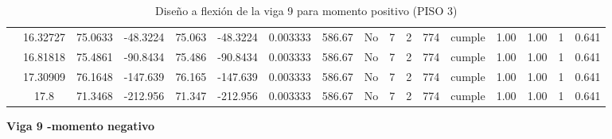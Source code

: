 \begin{table}[H]
{\begin{tabular}{|c|c|c|c|c|c|c|c|c|c|c|c|c|c|c|c|c|}
\cline{2-17}        & 16.32727 & 75.0633 & -48.3224 & 75.063 & -48.3224 & 0.003333 & 586.67 & No  & 7   & 2   & 774 & \cellcolor[rgb]{ .776,  .937,  .808}cumple & 1.00 & 1.00 & 1   & 0.641 \bigstrut\\
\cline{2-17}        & 16.81818 & 75.4861 & -90.8434 & 75.486 & -90.8434 & 0.003333 & 586.67 & No  & 7   & 2   & 774 & \cellcolor[rgb]{ .776,  .937,  .808}cumple & 1.00 & 1.00 & 1   & 0.641 \bigstrut\\
\cline{2-17}        & 17.30909 & 76.1648 & -147.639 & 76.165 & -147.639 & 0.003333 & 586.67 & No  & 7   & 2   & 774 & \cellcolor[rgb]{ .776,  .937,  .808}cumple & 1.00 & 1.00 & 1   & 0.641 \bigstrut\\
\cline{2-17}        & 17.8 & 71.3468 & -212.956 & 71.347 & -212.956 & 0.003333 & 586.67 & No  & 7   & 2   & 774 & \cellcolor[rgb]{ .776,  .937,  .808}cumple & 1.00 & 1.00 & 1   & 0.641 \bigstrut\\
    \hline
    \end{tabular}%
  
  

  }%
    \caption{Diseño a flexión de la viga 9 para momento positivo (PISO 3) }
  \label{tab:F VG9 P3 M+}%
\end{table}%
\newpage
\textbf{Viga 9 -momento negativo}
